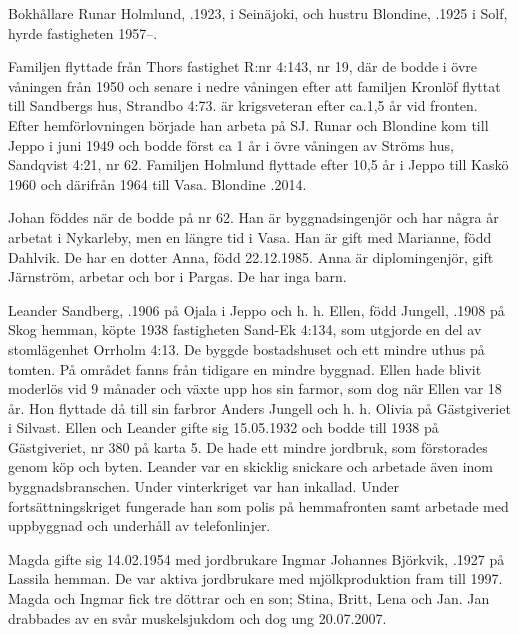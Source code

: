 Bokhållare Runar Holmlund, .1923, i Seinäjoki, och hustru Blondine, .1925 i Solf, hyrde fastigheten 1957--.
\begin{jhchildren}
  \item {}
  \item {}
\end{jhchildren}
Familjen flyttade från Thors fastighet R:nr 4:143, nr 19, där de bodde i övre våningen från 1950 och senare i nedre våningen efter att familjen Kronlöf flyttat till Sandbergs hus, Strandbo 4:73.  är krigsveteran efter ca.1,5 år vid fronten. Efter hemförlovningen började han arbeta på SJ. Runar och Blondine kom till Jeppo i juni 1949 och bodde först ca 1 år i övre våningen av Ströms hus, Sandqvist 4:21, nr 62. Familjen Holmlund flyttade efter 10,5 år i Jeppo till Kaskö 1960 och därifrån 1964 till Vasa. Blondine .2014.

Johan föddes när de bodde på nr 62. Han är byggnadsingenjör och har några år arbetat i Nykarleby, men en längre tid i Vasa. Han är gift med Marianne, född Dahlvik. De har en dotter Anna, född 22.12.1985. Anna är diplomingenjör, gift Järnström, arbetar och bor i Pargas. De har inga barn.


Leander Sandberg, .1906 på Ojala i Jeppo och h. h. Ellen, född Jungell, .1908 på Skog hemman, köpte 1938 fastigheten Sand-Ek 4:134, som utgjorde en del av stomlägenhet Orrholm 4:13. De byggde bostadshuset och ett mindre uthus på tomten. På området fanns från tidigare en mindre byggnad. Ellen hade blivit moderlös vid 9 månader och växte upp hos sin farmor, som dog när Ellen var 18 år. Hon flyttade då till sin farbror Anders Jungell och h. h. Olivia på Gästgiveriet i Silvast. Ellen och Leander gifte sig 15.05.1932 och bodde till 1938 på Gästgiveriet, nr 380 på karta 5. De hade ett mindre jordbruk, som förstorades genom köp och byten. Leander var en skicklig snickare och arbetade även inom byggnadsbranschen. Under vinterkriget var han inkallad. Under fortsättningskriget fungerade han som polis på hemmafronten samt arbetade med uppbyggnad och underhåll av telefonlinjer.
\begin{jhchildren}
  \item {}
  \item {}
\end{jhchildren}
Magda gifte sig 14.02.1954 med jordbrukare Ingmar Johannes Björkvik, .1927 på Lassila hemman. De var aktiva jordbrukare med mjölkproduktion fram till 1997. Magda och Ingmar fick tre döttrar och en son; Stina, Britt, Lena och Jan. Jan drabbades av en svår muskelsjukdom och dog ung 20.07.2007.

